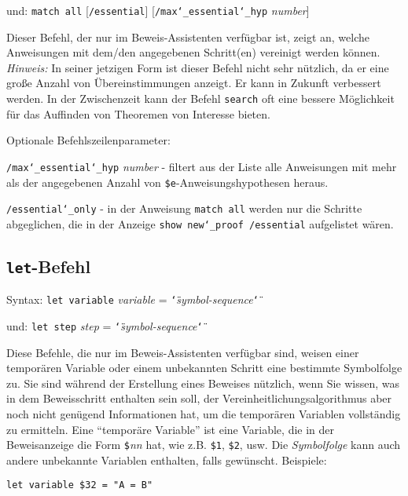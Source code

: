     und:  \texttt{match all} [\texttt{/essential}]
          [\texttt{/max{\char`\_}essential{\char`\_}hyp} {\em number}]

Dieser Befehl, der nur im Beweis-Assistenten verfügbar ist, zeigt an, welche Anweisungen mit dem/den angegebenen Schritt(en) vereinigt werden können.  {\em Hinweis:} In seiner jetzigen Form ist dieser Befehl nicht sehr nützlich, da er eine große Anzahl von Übereinstimmungen anzeigt. Er kann in Zukunft verbessert werden.  In der Zwischenzeit kann der Befehl \texttt{search} oft eine bessere Möglichkeit für das Auffinden von Theoremen von Interesse bieten.

Optionale Befehlszeilenparameter:

    \texttt{/max{\char`\_}essential{\char`\_}hyp} {\em number} - filtert aus der Liste alle Anweisungen mit mehr als der angegebenen Anzahl von \texttt{\$e}-Anweisungshypothesen heraus.

    \texttt{/essential{\char`\_}only} - in der Anweisung \texttt{match all} werden nur die Schritte abgeglichen, die in der Anzeige \texttt{show new{\char`\_}proof /essential} aufgelistet wären.


\subsection{\texttt{let}-Befehl}

Syntax: \texttt{let variable} {\em variable} = \texttt{\char`\"}{\em symbol-sequence}\texttt{\char`\"}

  und: \texttt{let step} {\em step} = \texttt{\char`\"}{\em symbol-sequence}\texttt{\char`\"}

Diese Befehle, die nur im Beweis-Assistenten verfügbar sind, weisen einer temporären Variable oder einem unbekannten Schritt eine bestimmte Symbolfolge zu.  Sie sind während der Erstellung eines Beweises nützlich, wenn Sie wissen, was in dem Beweisschritt enthalten sein soll, der Vereinheitlichungsalgorithmus aber noch nicht genügend Informationen hat, um die temporären Variablen vollständig zu ermitteln.  Eine "`temporäre Variable"' ist eine Variable, die in der Beweisanzeige die Form \texttt{\$}{\em nn} hat, wie z.B. \texttt{\$1}, \texttt{\$2}, usw.  Die {\em Symbolfolge} kann auch andere unbekannte Variablen enthalten, falls gewünscht.  Beispiele:

    \verb/let variable $32 = "A = B"/

